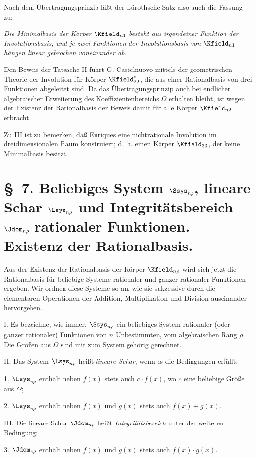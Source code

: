 \documentclass[11pt]{article}
\begin{document}
Nach dem Übertragungsprinzip läßt der Lürothsche Satz also auch die Fassung zu:

\emph{Die Minimalbasis der Körper $\Kfield_{n1}$ besteht aus irgendeiner Funktion der Involutionsbasis; und je zwei Funktionen der Involutionsbasis von $\Kfield_{n1}$ hängen linear gebrochen voneinander ab.}

Den Beweis der Tatsache II führt G. Castelnuovo mittels der geometrischen Theorie der Involution für Körper $\Kfield^*_{22}$, die aus einer Rationalbasis von drei Funktionen abgeleitet sind. Da das Übertragungsprinzip auch bei endlicher algebraischer Erweiterung des Koeffizientenbereichs $\Omega$ erhalten bleibt, ist wegen der Existenz der Rationalbasis der Beweis damit für alle Körper $\Kfield_{n2}$ erbracht.

Zu III ist zu bemerken, daß Enriques eine nichtrationale Involution im dreidimensionalen Raum konstruiert; d.~h. einen Körper $\Kfield_{33}$, der keine Minimalbasis besitzt.

\section*{\S\ 7. Beliebiges System $\Ssys_{n\rho}$, lineare Schar $\Lsys_{n\rho}$ und Integritätsbereich $\Jdom_{n\rho}$ rationaler Funktionen. Existenz der Rationalbasis.}

Aus der Existenz der Rationalbasis der Körper $\Kfield_{n\rho}$ wird sich jetzt die Rationalbasis für beliebige Systeme rationaler und ganzer rationaler Funktionen ergeben. Wir ordnen diese Systeme so an, wie sie sukzessive durch die elementaren Operationen der Addition, Multiplikation und Division auseinander hervorgehen.

I. Es bezeichne, wie immer, $\Ssys_{n\rho}$ ein beliebiges System rationaler (oder ganzer rationaler) Funktionen von $n$ Unbestimmten, vom algebraischen Rang $\rho$. Die Größen aus $\Omega$ sind mit zum System gehörig gerechnet.

II. Das System $\Lsys_{n\rho}$ heißt \emph{lineare Schar}, wenn es die Bedingungen erfüllt:

1. $\Lsys_{n\rho}$ enthält neben $f(x)$ stets auch $c\cdot f(x)$, wo $c$ eine beliebige Größe aus $\Omega$;

2. $\Lsys_{n\rho}$ enthält neben $f(x)$ und $g(x)$ stets auch $f(x)+g(x)$.

III. Die lineare Schar $\Jdom_{n\rho}$ heißt \emph{Integritätsbereich} unter der weiteren Bedingung:

3. $\Jdom_{n\rho}$ enthält neben $f(x)$ und $g(x)$ stets auch $f(x)\cdot g(x)$.
\end{document}
